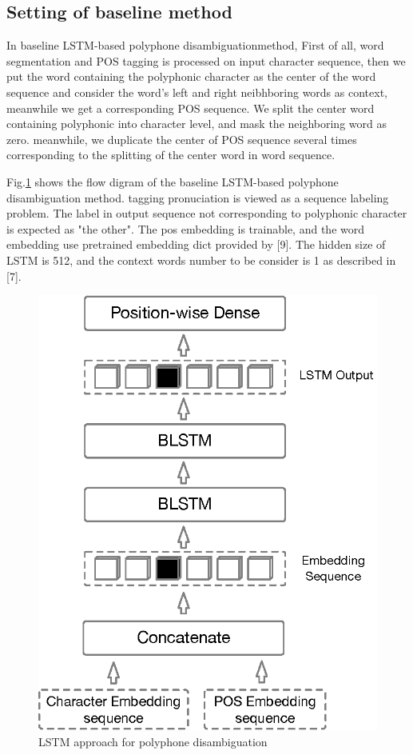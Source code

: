 \documentclass[a4paper]{article}
\begin{document}
\subsection{Setting of baseline method}

In baseline LSTM-based polyphone disambiguationmethod, First of all, word segmentation and POS tagging is processed on input character sequence, then we put the word containing the polyphonic character as the center of the word sequence and consider the word's left and right neibhboring words as context, meanwhile we get a corresponding POS sequence. We split the center word containing polyphonic into character level, and mask the neighboring word as zero. meanwhile, we duplicate the center of POS sequence several times corresponding to the splitting of the center word in word sequence.

Fig.\ref{fig:lstm_baseline} shows the flow digram of the baseline LSTM-based polyphone disambiguation method. tagging pronuciation is viewed as a sequence labeling problem. The label in output sequence not corresponding to polyphonic character is expected as "the other". The pos embedding is trainable, and the word embedding use pretrained embedding dict provided by [9]. The hidden size of LSTM is 512, and the context words number to be consider is 1 as described in [7]. 


\begin{figure}[t]
	\centering
	\includegraphics[scale=0.5]{pics/lstmbaseline2.eps}
	\caption{LSTM approach for polyphone disambiguation}
	\label{fig:lstm_baseline}
\end{figure}
\end{document}
